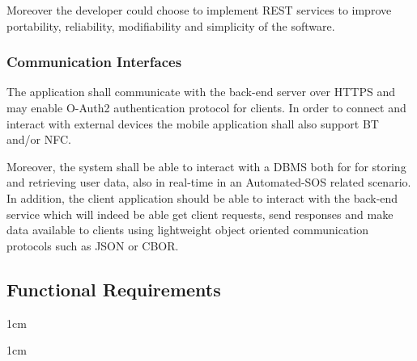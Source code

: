 \documentclass[a4paper]{article}
\begin{document}
        Moreover the developer could choose to implement REST services to improve portability, reliability, modifiability and simplicity of the software.
        
        \subsubsection{Communication Interfaces}
        The application shall communicate with the back-end server over HTTPS and may enable O-Auth2 authentication protocol for clients. In order to connect and interact with external devices the mobile application shall also support BT and/or NFC.
        
        Moreover, the system shall be able to interact with a DBMS both for for storing and retrieving user data, also in real-time in an Automated-SOS related scenario. In addition, the client application should be able to interact with the back-end service which will indeed be able get client requests, send responses and make data available to clients using lightweight object oriented communication protocols such as JSON or CBOR.

\newpage
\subsection{Functional Requirements}
    \newcommand{\indentsize}{1cm}
        
        
        \begin{addmargin}{\indentsize}
        \end{addmargin}
        
        \begin{addmargin}{\indentsize}
        \end{addmargin}
        
\end{document}
